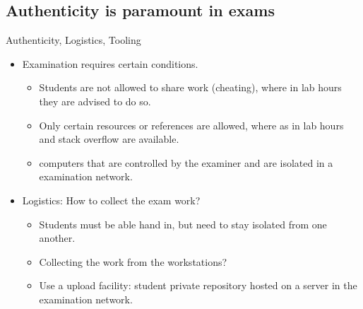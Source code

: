 \subsection[Authenticity]{Authenticity is paramount in exams}
\begin{frame}{Authenticity, Logistics, Tooling}
  \begin{itemize}
  \item Examination requires certain conditions.
    \begin{itemize}
    \item Students are not allowed to share work (cheating), where in lab hours
      they are advised to do so.
    \item Only certain resources or references are allowed, where as
      in lab hours  and \alert{stack overflow} are available.
    \item {} computers that are controlled by the examiner and
      are isolated in a examination network.
    \end{itemize}
  \item Logistics: How to collect the exam work?
    \begin{itemize}
    \item Students must be able hand in, but need to stay isolated from one another.
    \item Collecting the work from the workstations?

    \item Use a upload facility: student private repository hosted on
      a server in the examination network.
    \end{itemize}
  \end{itemize}
\end{frame}

